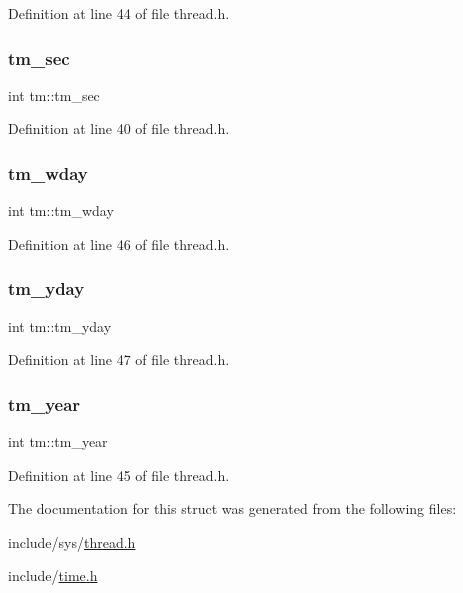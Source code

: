 Definition at line 44 of file thread.\+h.

\mbox{\label{structtm_a4d098a9a5c03a00b2ee61e10851de81e}} 
\subsubsection{\texorpdfstring{tm\_sec}{tm\_sec}}
{\footnotesize\ttfamily int tm\+::tm\+\_\+sec}



Definition at line 40 of file thread.\+h.

\mbox{\label{structtm_afe81a8c46f1c693c43f259b288859f4f}} 
\subsubsection{\texorpdfstring{tm\_wday}{tm\_wday}}
{\footnotesize\ttfamily int tm\+::tm\+\_\+wday}



Definition at line 46 of file thread.\+h.

\mbox{\label{structtm_a93a0ba77cc23796df84405dcbcc57eb1}} 
\subsubsection{\texorpdfstring{tm\_yday}{tm\_yday}}
{\footnotesize\ttfamily int tm\+::tm\+\_\+yday}



Definition at line 47 of file thread.\+h.

\mbox{\label{structtm_a33adf78fd6476b2120ce3b9c4a852053}} 
\subsubsection{\texorpdfstring{tm\_year}{tm\_year}}
{\footnotesize\ttfamily int tm\+::tm\+\_\+year}



Definition at line 45 of file thread.\+h.



The documentation for this struct was generated from the following files\+:\begin{DoxyCompactItemize}
\item 
include/sys/\mbox{\hyperlink{thread_8h}{thread.\+h}}\item 
include/\mbox{\hyperlink{time_8h}{time.\+h}}\end{DoxyCompactItemize}
